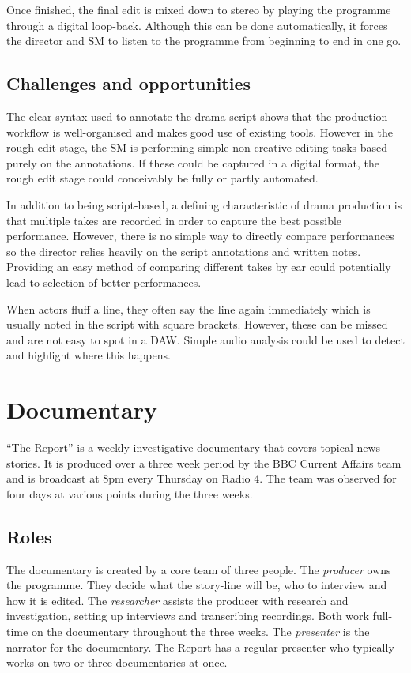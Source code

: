 Once finished, the final edit is mixed down to stereo by playing the programme
through a digital loop-back. Although this can be done automatically, it forces
the director and SM to listen to the programme from beginning to end in one
go.

\subsection{Challenges and opportunities}
The clear syntax used to annotate the drama script shows that the production
workflow is well-organised and makes good use of existing tools. However in the
rough edit stage, the SM is performing simple non-creative editing tasks based
purely on the annotations. If these could be captured in a digital format, the
rough edit stage could conceivably be fully or partly automated.

In addition to being script-based, a defining characteristic of drama
production is that multiple takes are recorded in order to capture the best
possible performance. However, there is no simple way to directly compare
performances so the director relies heavily on the script annotations and
written notes. Providing an easy method of comparing different takes by ear
could potentially lead to selection of better performances.

When actors fluff a line, they often say the line again immediately which is
usually noted in the script with square brackets. However, these can be missed
and are not easy to spot in a DAW. Simple audio analysis could be used to
detect and highlight where this happens.

\section{Documentary}\label{sec:doc}
``The Report'' is a weekly investigative documentary that covers topical news
stories. It is produced over a three week period by the BBC Current Affairs
team and is broadcast at 8pm every Thursday on Radio 4. The team was observed
for four days at various points during the three weeks.

\subsection{Roles}
The documentary is created by a core team of three people. The
\textit{producer} owns the programme. They decide what the story-line will be,
who to interview and how it is edited. The \textit{researcher} assists
the producer with research and investigation, setting up interviews and
transcribing recordings.  Both work full-time on the documentary throughout
the three weeks.  The \textit{presenter} is the narrator for the documentary.
The Report has a regular presenter who typically works on two or three
documentaries at once.

